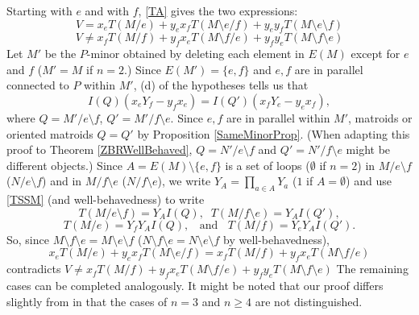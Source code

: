 \documentclass[12pt,leqno]{amsart}
\theoremstyle{remark}
\begin{document}
Starting with $e$ and with $f$, \eqref{TA} gives the two expressions:
\[
V= x_e T(M/e) + y_e x_f T(M\setminus e /f) + y_e y_f T(M\setminus e\setminus f)
\]
\[
V\neq 
   x_f T(M/f) + y_f x_e T(M\setminus f /e) + y_f y_e T(M\setminus f\setminus e)
\]
Let $M'$ be the $P$-minor obtained by deleting each element
in $E(M)$ except for $e$ and $f$ ($M'=M$ if $n=2$.)
Since 
$E(M')=\{e,f\}$ and $e,f$ are in parallel connected to $P$ within
$M'$, (d) of the hypotheses  tells us that
\[
I(Q) (x_e Y_f - y_f x_e) =
I(Q') (x_f Y_e - y_e x_f ),
\]
where $Q=M'/e \setminus f$, $Q'=M'/f \setminus e$.  
Since $e,f$ are in parallel within $M'$,
matroids
or oriented matroids $Q=Q'$ by Proposition \ref{SameMinorProp}.
(When adapting this proof to Theorem \ref{ZBRWellBehaved}, 
$Q=N'/e\setminus f$ and $Q'=N'/f\setminus e$ might be
different objects.)
Since $A=E(M)\setminus\{e,f\}$ is a set of loops ($\emptyset$ if $n=2$)
in
$M/e\setminus f$ ($N/e\setminus f$) and 
in $M/f\setminus e$ ($N/f\setminus e$), we 
write $Y_A=\prod_{a\in A}Y_a$ ($1$ if $A=\emptyset$)
and use \eqref{TSSM} (and well-behavedness) to write
\[
T(M/e\setminus f) = Y_A I(Q ),\;\;
T(M/f\setminus e) = Y_A I(Q' ),
\]
\[
T(M/e) = Y_f Y_A I(Q ),\;\;\text{ and }\;\;
T(M/f) = Y_e Y_A I(Q' ).
\]
So, since $M\setminus f\setminus e=M\setminus e\setminus f$ 
($N\setminus f\setminus e=N\setminus e\setminus f$ by well-behavedness),
\[
x_e T(M/e) + y_e x_f T(M\setminus e /f)
=
x_f T(M/f) + y_f x_e T(M\setminus f /e)
\]
contradicts 
$V\neq 
x_f T(M/f) + y_f x_e T(M\setminus f /e) + y_f y_e T(M\setminus f\setminus e)$
The remaining cases can be completed analogously.  It might be
noted that our proof differs slightly from \cite{Ellis-Monaghan-Traldi}
in that the cases of $n=3$ and $n\ge 4$ are not distinguished.
\end{document}

